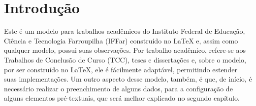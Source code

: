 \chapter{Introdução}
Este é um modelo para trabalhos acadêmicos do Instituto Federal de Educação, Ciência e Tecnologia Farroupilha (IFFar) construído no \LaTeX{} e, assim como qualquer modelo, possui suas observações. Por trabalho acadêmico, refere-se aos Trabalhos de Conclusão de Curso (TCC), teses e dissertações e, sobre o modelo, por ser construído no \LaTeX, ele é fácilmente adaptável, permitindo estender suas implementações. Um outro aspecto desse modelo, também, é que, de início, é necessário realizar o preenchimento de alguns dados, para a configuração de alguns elementos pré-textuais, que será melhor explicado no segundo capítulo.
